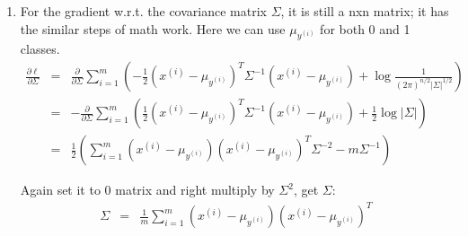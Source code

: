 \begin{answer}
\begin{enumerate}
\item For the gradient w.r.t. the covariance matrix $\Sigma$, it is still a nxn matrix; 
it has the similar steps of math work. Here we can use $\mu_{y^{(i)}}$ for both 0 and 1 classes. 
\begin{eqnarray*}
\frac{\partial \ell}{\partial \Sigma}
	&=& \frac{\partial}{\partial \Sigma} \sum_{i=1}^m \left( -\frac{1}{2}(x^{(i)}-\mu_{y^{(i)}})^T \Sigma^{-1} (x^{(i)}-\mu_{y^{(i)}}) 
		+ \log {\frac{1}{(2\pi)^{n/2} |\Sigma|^{1/2}} }\right ) \\
	&=& -\frac{\partial}{\partial \Sigma} \sum_{i=1}^m \left( \frac{1}{2}(x^{(i)}-\mu_{y^{(i)}})^T \Sigma^{-1} (x^{(i)}-\mu_{y^{(i)}}) 
		+ \frac{1}{2} \log {|\Sigma|}\right ) \\
	&=& \frac{1}{2} \left (\sum_{i=1}^m (x^{(i)}-\mu_{y^{(i)}})(x^{(i)}-\mu_{y^{(i)}})^T\Sigma^{-2} - m \Sigma^{-1} \right )
\end{eqnarray*}

Again set it to 0 matrix and right multiply by $\Sigma^2$, get $\Sigma$:
\begin{eqnarray*}
\Sigma &=& \frac{1}{m} \sum_{i=1}^m (x^{(i)} - \mu_{y^{(i)}}) (x^{(i)} - \mu_{y^{(i)}})^T
\end{eqnarray*}

\end{enumerate}

\end{answer}
